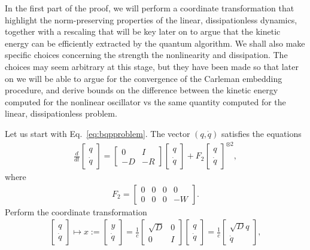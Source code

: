 \documentclass[superscriptaddress,onecolumn,nofootinbib,longbibliography,a4paper,accepted=2026-09-29]{quantumarticle}
\theoremstyle{plain}
\theoremstyle{definition}
\numberwithin{thm}{section}
\numberwithin{assumption}{section}
\numberwithin{lemma}{section}
\numberwithin{prop}{section}
\numberwithin{cor}{section}
\numberwithin{definition}{section}
\numberwithin{rmk}{section}
\numberwithin{equation}{section}
\begin{document}
In the first part of the proof, we will perform a coordinate transformation that highlight the norm-preserving properties of the linear, dissipationless dynamics, together with a rescaling that will be key later on to argue that the kinetic energy can be efficiently extracted by the quantum algorithm. We shall also make specific choices concerning the strength the nonlinearity and dissipation. The choices may seem arbitrary at this stage, but they have been made so that later on we will be able to argue for the convergence of the Carleman embedding procedure, and derive bounds on the difference between the kinetic energy computed for the nonlinear oscillator vs the same quantity computed for the linear, dissipationless problem.

Let us start with Eq.~\eqref{eq:bqpproblem}. 
The vector $(q, \dot{q})$ satisfies the equations
\begin{align}
    \frac{d}{dt} \begin{bmatrix} q \\ \dot{q} \end{bmatrix}  =  \begin{bmatrix}
       0 &  I \\
       - D & - R
   \end{bmatrix}  \begin{bmatrix} q \\ \dot{q} \end{bmatrix} + F_2  \begin{bmatrix} q \\ \dot{q} \end{bmatrix}^{\otimes 2},
\end{align}
where 
\begin{align}
    F_2 = \begin{bmatrix}
        0 & 0 & 0 & 0 \\
        0 & 0 & 0 & -W
    \end{bmatrix}. 
\end{align}
Perform the coordinate transformation 
\begin{align}
 \begin{bmatrix} q \\ \dot{q} \end{bmatrix} \mapsto   x := \begin{bmatrix} y \\ \dot{q} \end{bmatrix} = \frac{1}{c} \begin{bmatrix}
        \sqrt{D} & 0 \\ 
        0 & I
    \end{bmatrix} \begin{bmatrix} q \\ \dot{q} \end{bmatrix}  = \frac{1}{c} \begin{bmatrix} \sqrt{D} q \\ \dot{q} \end{bmatrix}, 
\end{align}
\end{document}
